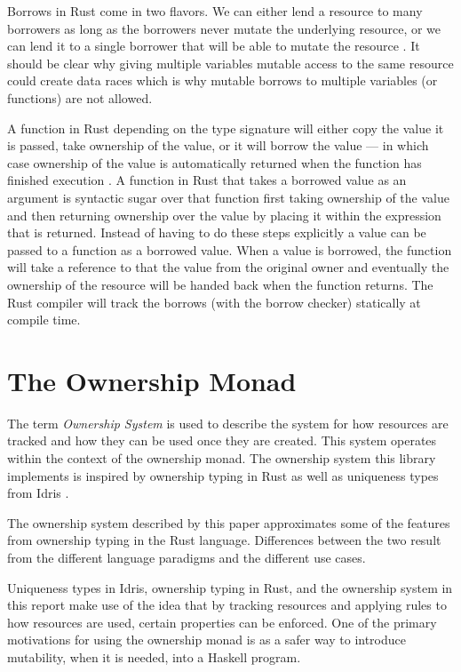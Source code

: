 \documentclass[onehalf,11pt]{beavtex}
\begin{document}
Borrows in Rust come in two flavors. We can either lend a resource to many
borrowers as long as the borrowers never mutate the underlying resource, or we
can lend it to a single borrower that will be able to mutate the
resource \cite{rust_book_borrowing}.
It should be clear why giving multiple variables mutable access to
the same resource could create data races which is why mutable borrows to
multiple variables (or functions) are not allowed.

A function in Rust depending on the type signature will either copy the value
it is passed, take ownership of the value, or it will borrow the value --- in
which case ownership of the value is automatically returned when the function
has finished execution \cite{rust_book_ownership}.
A function in Rust that takes a borrowed value as an argument is
syntactic sugar over that function first taking ownership of the value and then
returning ownership over the value by placing it within the expression that is
returned.
Instead of having to do these steps explicitly a value can be passed to a
function as a borrowed value.  When a value is borrowed, the function will take
a reference to that the value from the original owner and eventually the
ownership of the resource will be handed back when the function returns.
The Rust compiler will track the borrows (with the borrow checker) statically at
compile time.

\chapter{The Ownership Monad}

The term \textit{Ownership System} is used to describe the system for how
resources are tracked and how they can be used once they are created. This
system operates within the context of the ownership monad.
The ownership system this library implements is inspired by
ownership typing in Rust \cite{rust_book_ownership}
as well as uniqueness types from Idris \cite{idris_uniqueness_types}.

The ownership system described by this paper approximates some of the
features from ownership typing in the Rust language. Differences between
the two result from the different language paradigms and the different use
cases.

Uniqueness types in Idris, ownership typing in Rust, and the ownership system in
this report make use of the idea that by tracking resources and applying rules
to how resources are used, certain properties can be enforced.
One of the primary motivations for using the ownership monad is as a
safer way to introduce mutability, when it is needed, into a Haskell program.
\end{document}
